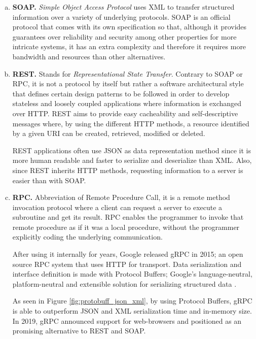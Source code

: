 \begin{enumerate}[a)]
	\item \textbf{SOAP.} \textit{Simple Object Access Protocol} \cite{SOAP} uses XML to transfer structured information over a variety of underlying protocols. SOAP is an official protocol that comes with its own specification so that, although it provides guarantees over reliability and security among other properties for more intricate systems, it has an extra complexity and therefore it requires more bandwidth and resources than other alternatives.

	\item \textbf{REST.} Stands for \textit{Representational State Transfer}. Contrary to SOAP or RPC, it is not a protocol by itself but rather a software architectural style that defines certain design patterns to be followed in order to develop stateless and loosely coupled applications where information is exchanged over HTTP. REST aims to provide easy cacheability and self-descriptive messages where, by using  the different HTTP  methods, a resource identified by a given URI can be created, retrieved, modified or deleted. 
	
	REST applications often use JSON as data representation method since it is more human readable and faster to serialize and deserialize than XML. Also, since REST inherits HTTP methods, requesting information to a server is easier than with SOAP.

	\item \textbf{RPC.} Abbreviation of Remote Procedure Call, it is a remote method invocation protocol where a client can request a server to execute a subroutine and get its result. RPC enables the programmer to invoke that remote procedure as if it was a local procedure, without the programmer explicitly coding the underlying communication.
	
	After using it internally for years, Google released gRPC \cite{grpc} in 2015; an open source RPC system that uses HTTP for transport. Data serialization and interface definition is made with Protocol Buffers; Google's language-neutral, platform-neutral and extensible solution for serializing structured data \cite{protobuf}.
	
	As seen in Figure \ref{fig:protobuff_json_xml}, by using Protocol Buffers, gRPC is able to outperform JSON and XML serialization time and in-memory size. In 2019, gRPC announced support for web-browsers \cite{grpc-web-announce} and positioned as an promising alternative to REST and SOAP. 
	

\end{enumerate}
